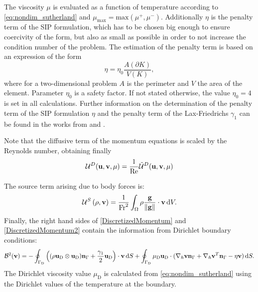 The viscosity $\mu$ is evaluated as a function of temperature according to \cref{eq:nondim_sutherland} and $\mu_{\text{max}} = \text{max}(\mu^{+}, \mu^{-})$.  Additionally  $\eta$ is the penalty term of the SIP formulation, which has to be chosen big enough to ensure coercivity of the form, but also as small as possible in order to not increase the condition number of the problem. The estimation of the penalty term is based on an expression of the form
\begin{equation}
	\eta = \eta_0 \frac{A(\partial K)}{V(K)},
\end{equation}\label{eq:PenaltyFactor}
where for a two-dimensional problem $A$ is the perimeter and $V$ the area of the element. Parameter $\eta_0$ is a safety factor. If not stated otherwise, the value  $\eta_0 = 4$ is  set in all calculations. Further information on the determination of the penalty term of the SIP formulation $\eta$ and the penalty term of the Lax-Friedrichs $\gamma_1 $ can be found in  the works from \textcite{hesthavenNodalDiscontinuousGalerkin2008} and \textcite{hillewaertDevelopmentDiscontinuousGalerkin2013}.

Note that the diffusive term of the momentum equations is scaled by the Reynolds number, obtaining finally
\begin{equation}
		\mathcal{U}^D(\textbf{u},\textbf{v},\mu) = 	\frac{1}{\text{Re}}\tilde{\mathcal{U}}^D(\textbf{u},\textbf{v},\mu)
\end{equation}

The source term arising due to body forces is:
\begin{equation}
	\mathcal{U}^S\left(\rho, \textbf{v}\right) =  \smash{\frac{1}{\text{Fr}^2}}\int_{\Omega}{  \rho \frac{\textbf{g}}{\Vert \textbf{g} \Vert}\cdot \textbf{v}} \,\mathrm{d} V.  \label{eq:Mom_source}
\end{equation}
Finally, the right hand sides of \cref{DiscretizedMomentum} and \cref{DiscretizedMomentum2} contain the information from Dirichlet boundary conditions:
\begin{equation}
	\mathcal{B}^2(\textbf{v}) =
	-\oint_{\Gamma_{\text{D}}}{ \left( (\rho\textbf{u}_{\text{D}}\otimes\textbf{u}_{\text{D}} )\textbf{n}_{\Gamma} + \frac{\gamma_1}{2}\textbf{u}_{\text{D}}\right)\cdot\textbf{v} \,\mathrm{d} S}  +
	\oint_{\Gamma_{\text{D}}}{\mu_{\text{D}}\textbf{u}_{\text{D}}\cdot(\nabla_h\textbf{v} \textbf{n}_{\Gamma} + \nabla_h\textbf{v}^T \textbf{n}_{\Gamma}- \eta \textbf{v} )\,\mathrm{d} S.}
\end{equation}
The Dirichlet viscosity value $\mu_{\text{D}}$ is calculated from \cref{eq:nondim_sutherland} using the Dirichlet values of the temperature at the boundary.
